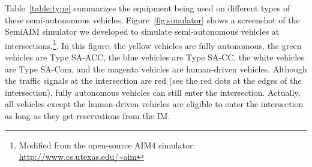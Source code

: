 Table~\ref{table:type} summarizes the equipment being used on
different types of these semi-autonomous vehicles.
Figure~\ref{fig:simulator} shows a screenshot of the SemiAIM simulator
we developed to simulate semi-autonomous vehicles at
intersections.\footnote{Modified from the open-source AIM4 simulator:
\url{http://www.cs.utexas.edu/~aim}}.  In this figure, the yellow
vehicles are fully autonomous, the green vehicles are Type SA-ACC, the
blue vehicles are Type SA-CC, the white vehicles are Type SA-Com, and
the magenta vehicles are human-driven vehicles.  Although the traffic
signals at the intersection are red (see the red dots at the edges of
the intersection), fully autonomous vehicles can still enter the
intersection. Actually, all vehicles except the human-driven vehicles
are eligible to enter the intersection as long as they get
reservations from the IM.









